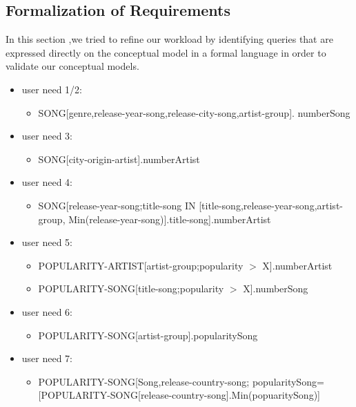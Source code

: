 \documentclass[12pt]{article}
\begin{document}
\subsection{Formalization of Requirements }
In this section ,we tried to refine our workload by identifying queries that are expressed directly on the conceptual model in a formal language in order to validate our conceptual models.
\begin{itemize}
\item user need 1/2:
\begin{itemize}
\item SONG[genre,release-year-song,release-city-song,artist-group].
numberSong 
\end{itemize}

\item user need 3:
\begin{itemize}
\item SONG[city-origin-artist].numberArtist 
\end{itemize}
\item user need 4:
\begin{itemize}
\item SONG[release-year-song;title-song IN [title-song,release-year-song,artist-group,
Min(release-year-song)].title-song].numberArtist
\end{itemize}
\item user need 5:
\begin{itemize}
\item POPULARITY-ARTIST[artist-group;popularity $>$ X].numberArtist
\item POPULARITY-SONG[title-song;popularity $>$ X].numberSong
\end {itemize}
\item user need 6:
\begin{itemize}
\item POPULARITY-SONG[artist-group].popularitySong
 \end{itemize}
\item user need 7:
\begin{itemize}
\item POPULARITY-SONG[Song,release-country-song;\hfill \break
popularitySong=[POPULARITY-SONG[release-country-song].Min(popuaritySong)]
\end{itemize}

\end{itemize}
\end{document}
